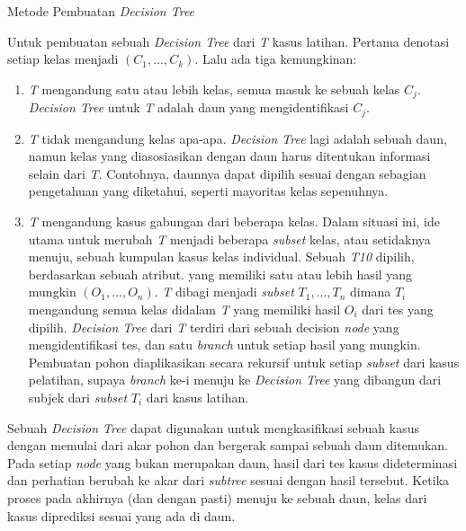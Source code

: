 \begin{algorithm}
  \caption{Metode Pembuatan \textit{Decision Tree}}
  \begin{algorithmic} [1]
    \State Untuk pembuatan sebuah \emph{Decision Tree} dari \textit{T} 
    kasus latihan. Pertama denotasi setiap kelas menjadi $(C_1,...,C_k)$. 
    \State Lalu ada tiga kemungkinan: 
      \begin{enumerate} 
        \item \textit{T} mengandung satu atau lebih kelas, semua masuk ke sebuah 
        kelas $C_j$. \emph{Decision Tree} untuk \textit{T} adalah daun yang 
        mengidentifikasi $C_j$.
        \item \textit{T} tidak mengandung kelas apa-apa. \emph{Decision Tree} lagi 
        adalah sebuah daun, namun kelas yang diasosiasikan dengan daun 
        harus ditentukan informasi selain dari \textit{T}. Contohnya, daunnya 
        dapat dipilih sesuai dengan sebagian pengetahuan yang diketahui, 
        seperti mayoritas kelas sepenuhnya.
        \item \textit{T} mengandung kasus gabungan dari beberapa kelas. 
        Dalam situasi ini, ide utama untuk merubah \textit{T} menjadi beberapa 
        \emph{subset} kelas, atau setidaknya menuju, sebuah kumpulan kasus kelas 
        individual. Sebuah \textit{T10} dipilih, berdasarkan sebuah atribut. 
        yang memiliki satu atau lebih hasil yang mungkin $(O_1,...,O_n)$. 
        \textit{T} dibagi menjadi \emph{subset} $T_1,...,T_n$ dimana $T_i$ 
        mengandung semua kelas didalam \textit{T} yang memiliki hasil $O_i$ 
        dari tes yang dipilih. \emph{Decision Tree} dari \textit{T} terdiri dari sebuah 
        decision \emph{node} yang mengidentifikasi tes, dan satu \emph{branch} untuk 
        setiap hasil yang mungkin. Pembuatan pohon diaplikasikan 
        secara rekursif untuk setiap \emph{subset} dari kasus pelatihan, 
        supaya \emph{branch} ke-i menuju ke \emph{Decision Tree} yang dibangun 
        dari subjek dari \emph{subset} $T_i$ dari kasus latihan. 
      \end{enumerate}
  \end{algorithmic}
\end{algorithm}

Sebuah \emph{Decision Tree} dapat digunakan untuk mengkasifikasi sebuah kasus 
dengan memulai dari akar pohon dan bergerak sampai sebuah daun ditemukan. 
Pada setiap \emph{node} yang bukan merupakan daun, hasil dari tes kasus 
dideterminasi dan perhatian berubah ke akar dari \emph{subtree} sesuai 
dengan hasil tersebut. Ketika proses pada akhirnya (dan dengan pasti) 
menuju ke sebuah daun, kelas dari kasus diprediksi sesuai yang ada di daun.

